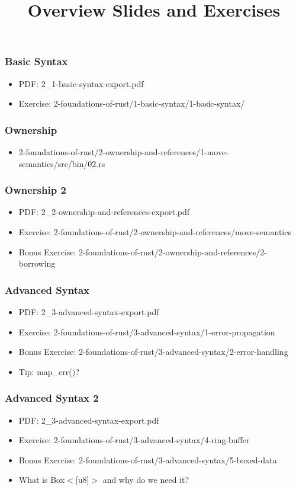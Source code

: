 \documentclass{beamer}
\title{Overview Slides and Exercises}
\begin{document}
	
\frame{\titlepage}



\begin{frame}
	\frametitle{Basic Syntax}
	\begin{itemize}
		\item PDF: 2\_1-basic-syntax-export.pdf
		\item Exercise: 2-foundations-of-rust/1-basic-syntax/1-basic-syntax/
	\end{itemize}
\end{frame}
	
\begin{frame}
	\frametitle{Ownership}
	\begin{itemize}
		\item 2-foundations-of-rust/2-ownership-and-references/1-move-semantics/src/bin/02.rs
	\end{itemize}
\end{frame}
	
\begin{frame}
	\frametitle{Ownership 2}
	\begin{itemize}
		\item PDF: 2\_2-ownership-and-references-export.pdf
		\item Exercise: 2-foundations-of-rust/2-ownership-and-references/move-semantics
		\item Bonus Exercise: 2-foundations-of-rust/2-ownership-and-references/2-borrowing
	\end{itemize}
\end{frame}

\begin{frame}
	\frametitle{Advanced Syntax}
	\begin{itemize}
		\item PDF: 2\_3-advanced-syntax-export.pdf
		\item Exercise: 2-foundations-of-rust/3-advanced-syntax/1-error-propagation
		\item Bonus Exercise: 2-foundations-of-rust/3-advanced-syntax/2-error-handling
		\item Tip: map\_err()?
	\end{itemize}
\end{frame}

\begin{frame}
	\frametitle{Advanced Syntax 2}
	\begin{itemize}
		\item PDF: 2\_3-advanced-syntax-export.pdf
		\item Exercise: 2-foundations-of-rust/3-advanced-syntax/4-ring-buffer
		\item Bonus Exercise: 2-foundations-of-rust/3-advanced-syntax/5-boxed-data
		\item What is Box$\mathrm{<}$[u8]$\mathrm{>}$ and why do we need it?
	\end{itemize}
\end{frame}
\end{document}

